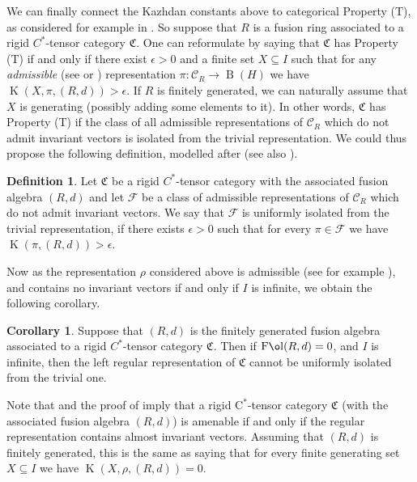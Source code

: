 \documentclass[11 pt, leqno]{amsart}
\newcommand{\mrm}{\mathrm}
\DeclareMathOperator{\Fol}{F\mathrm{\o}l}
\DeclareMathOperator{\Kaz}{K}
\DeclareMathOperator{\B}{B}
\theoremstyle{definition}
\newtheorem{corollary}[theorem]{Corollary}
\newtheorem{definition}[theorem]{Definition}
\numberwithin{equation}{section}
\begin{document}
We can finally connect the Kazhdan constants above to categorical Property (T), as considered for example in \cite{SergeyMakoto}. So suppose that $R$ is a fusion ring associated to a rigid $C^*$-tensor category $\mathfrak{C}$. One can reformulate \cite[Proposition 4.22]{SergeyMakoto} by saying that $\mathfrak{C}$ has Property (T) if and only if  there exist $\epsilon>0$ and a finite set $X\subseteq I$ such that for any \emph{admissible} (see \cite[Section 3]{SergeyMakoto} or \cite[Section 4]{PopaVaes}) representation $\pi\colon\mathcal{C}_R \to \B(H)$ we have $\Kaz(X,\pi,(R,d))>\epsilon$. If $R$ is finitely generated, we can naturally assume that $X$ is generating (possibly adding some elements to it). In other words, $\mathfrak{C}$ has Property (T) if the class of all admissible representations of $\mathcal{C}_R$ which do not admit invariant vectors is isolated from the trivial representation. We could thus propose the following definition, modelled after \cite[Definition 8.1]{Shalom} (see also \cite[Definition 3]{Osin}). 

\begin{definition}
	Let $\mathfrak{C}$ be a rigid $C^*$-tensor category with the associated fusion algebra $(R,d)$ and let $\mathcal{F}$ be a class of admissible representations of $\mathcal{C}_R$ which do not admit invariant vectors. We say that $\mathcal{F}$ is uniformly isolated from  the trivial representation, if there exists $\epsilon>0$ such that for every $\pi \in \mathcal{F}$ we have $\Kaz(\pi, (R,d)) >\epsilon$.
\end{definition}


Now as the representation $\rho$ considered above is admissible (see for example \cite[Corollary 4.4]{PopaVaes}), and contains no invariant vectors if and only if $I$ is infinite, we obtain the following corollary.


\begin{corollary}
	Suppose that $(R,d)$ is the finitely generated fusion algebra associated to a rigid $C^*$-tensor category $\mathfrak{C}$. Then if $\Fol(R,d)=0$, and $I$ is infinite, then the left regular representation of $\mathfrak{C}$ cannot be uniformly isolated from the trivial one.
\end{corollary}


Note that \cite[Theorem 4.1]{HiaiIzumi} and the proof of \cite[Proposition 5.3]{PopaVaes} imply that a rigid $\mrm{C}^*$-tensor category $\mathfrak{C}$ (with the associated fusion algebra $(R,d)$) is amenable if and only if the regular representation contains almost invariant vectors. Assuming that $(R,d)$ is finitely generated, this is the same as saying that for every finite generating set $X\subseteq I$ we have $\Kaz(X,\rho,(R,d))=0$.
\end{document}
